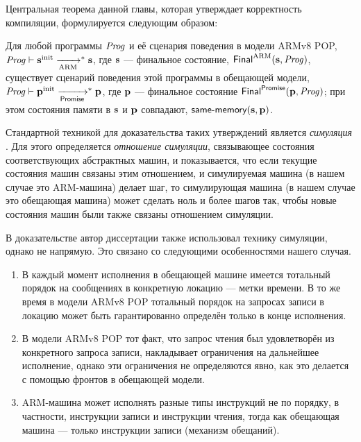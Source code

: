 Центральная теорема данной главы, которая утверждает корректность компиляции,
формулируется следующим образом:
\begin{theorem}
  \label{armvpop:mainthm}
  Для любой программы $\mathit{Prog}$ и её сценария поведения в модели ARMv8 POP,
  $\mathit{Prog} \vdash \mathbf{s}^{\rm init} \xrightarrow[\text{ARM}]{}^{*} \mathbf{s}$,
  где $\mathbf{s}$ --- финальное состояние, $\mathsf{Final}^{\text{ARM}}(\mathbf{s}, \mathit{Prog})$,
  существует сценарий поведения этой программы в обещающей модели,
  $\mathit{Prog} \vdash \mathbf{p}^{\rm init} \xrightarrow[\mathsf{Promise}]{}^{*} \mathbf{p}$,
  где $\mathbf{p}$ --- финальное состояние $\mathsf{Final}^{\mathsf{Promise}}(\mathbf{p}, \mathit{Prog})$;
  при этом состояния памяти в $\mathbf{s}$ и $\mathbf{p}$ совпадают, $\textup{\sf same-memory}(\mathbf{s}, \mathbf{p})$.
\end{theorem}

Стандартной техникой для доказательства таких утверждений является
\emph{симуляция} \cite{Milner:Book89, Lynch-Vaandrager:IC95, Lynch-Vaandrager:IC96}.
Для этого определяется \emph{отношение симуляции}, связывающее состояния соответствующих
абстрактных машин, и показывается, что если текущие состояния машин
связаны этим отношением, и симулируемая машина (в нашем случае это ARM-машина)
делает шаг, то симулирующая машина (в нашем случае это обещающая машина) может сделать ноль
и более шагов так, чтобы новые состояния машин были также связаны отношением симуляции.

В доказательстве автор диссертации также использовал технику симуляции, однако не напрямую.
Это связано со следующими особенностями нашего случая.
\begin{enumerate}
  \item В каждый момент исполнения в обещающей машине имеется тотальный
    порядок на сообщениях в конкретную локацию --- метки времени.
    В то же время в модели ARMv8 POP тотальный порядок на запросах записи 
    в локацию может быть гарантированно определён только в конце исполнения.
  \item В модели ARMv8 POP тот факт, что запрос чтения был удовлетворён
    из конкретного запроса записи, накладывает ограничения на дальнейшее исполнение,
    однако эти ограничения не определяются явно, как это делается с помощью
    фронтов в обещающей модели.
  \item ARM-машина может исполнять разные типы инструкций не по порядку,
    в частности, инструкции записи и инструкции чтения, тогда как
    обещающая машина --- только инструкции записи (механизм обещаний).
\end{enumerate}

